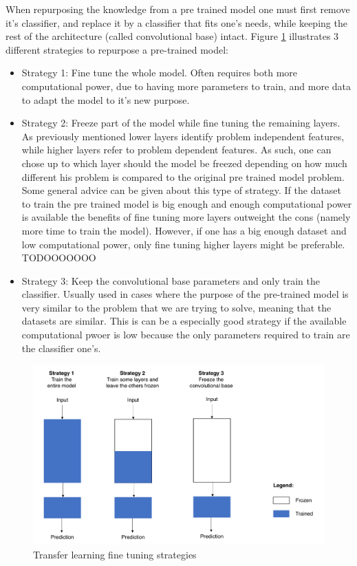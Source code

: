 When repurposing the knowledge from a pre trained model one must first remove it's classifier, and replace it by a classifier that fits one's needs, while keeping the rest of the architecture (called convolutional base) intact. Figure \ref{fig:transferlearning} illustrates 3 different strategies to repurpose a pre-trained model:
\begin{itemize}
    \item Strategy 1: Fine tune the whole model. Often requires both more computational power, due to having more parameters to train, and more data to adapt the model to it's new purpose. 
    \item Strategy 2: Freeze part of the model while fine tuning the remaining layers. As previously mentioned lower layers identify problem independent features, while higher layers refer to problem dependent features. As such, one can chose up to which layer should the model be freezed depending on how much different his problem is compared to the original pre trained model problem. Some general advice can be given about this type of strategy. If the dataset to train the pre trained model is big enough and enough computational power is available the benefits of fine tuning more layers outweight the cons (namely more time to train the model). However, if one has a big enough dataset and low computational power, only fine tuning higher layers might be preferable. TODOOOOOOO  
    \item Strategy 3: Keep the convolutional base parameters and only train the classifier. Usually used in cases where the purpose of the pre-trained model is very similar to the problem that we are trying to solve, meaning that the datasets are similar. This is can be a especially good strategy if the available computational pwoer is low because the only parameters required to train are the classifier one's.
\end{itemize}

\begin{figure}[ht]
  \centering
    \includegraphics[scale=0.5, width=\linewidth]{figs/transfer_learning.png}
  \caption{Transfer learning fine tuning strategies \cite{marctransferlearning}}
  \label{fig:transferlearning}
\end{figure}

